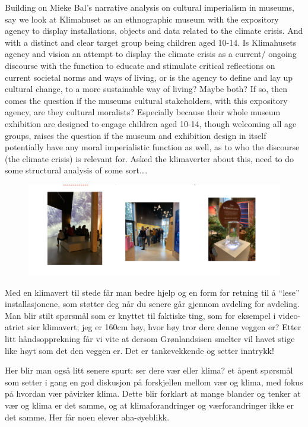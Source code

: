 Building on Mieke Bal’s narrative analysis on cultural imperialism in museums, say we look at Klimahuset as an ethnographic museum with the expository agency to display installations, objects and data related to the climate crisis. And with a distinct and clear target group being children aged 10-14. Is Klimahusets agency and vision an attempt to display the climate crisis as a current/ ongoing discourse with the function to educate and stimulate critical reflections on current societal norms and ways of living, or is the agency to define and lay up cultural change, to a more sustainable way of living? Maybe both? If so, then comes the question if the museums cultural stakeholders, with this expository agency, are they cultural moralists? Especially because their whole museum exhibition are designed to engage children aged 10-14, though welcoming all age groups, raises the question if the museum and exhibition design in itself potentially have any moral imperialistic function as well, as to who the discourse (the climate crisis) is relevant for. 
Asked the klimaverter about  this, need to do some structural analysis of some sort….

\begin{figure}[h]
\includegraphics[width=13cm]{pictures/elever_i_klimahuset.png}
\centering 
\end{figure}

Med en klimavert til stede får man bedre hjelp og en form for retning til å “lese” installasjonene, som støtter deg når du senere går gjennom avdeling for avdeling. 
Man blir stilt spørsmål som er knyttet til faktiske ting, som for eksempel i video-atriet sier klimavert; jeg er 160cm høy, hvor høy tror dere denne veggen er?
Etter litt håndsopprekning får vi vite at dersom Grønlandsisen smelter vil havet stige like høyt som det den veggen er. Det er tankevekkende og setter inntrykk!

Her blir man også litt senere spurt: ser dere vær eller klima? et åpent spørsmål som setter i gang en god diskusjon på forskjellen mellom vær og klima, med fokus på hvordan vær påvirker klima. Dette blir forklart at mange blander og tenker at vær og klima er det samme, og at klimaforandringer og værforandringer ikke er det samme. Her får noen elever aha-øyeblikk.


